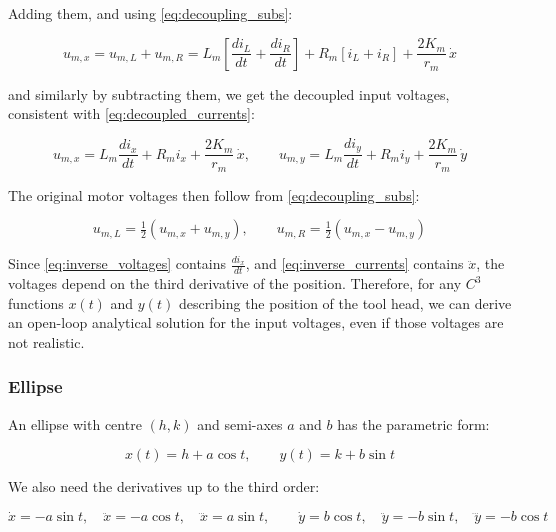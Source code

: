 Adding them, and using \eqref{eq:decoupling_subs}:

\begin{equation*}
u_{m,x} = u_{m,L} + u_{m,R}
        = L_m\left[\frac{di_L}{dt} + \frac{di_R}{dt}\right] + R_m\left[i_L + i_R\right] + \frac{2K_m}{r_m}\,\dot x
\end{equation*}

and similarly by subtracting them, we get the decoupled input voltages, consistent with \eqref{eq:decoupled_currents}:

\begin{equation}
\label{eq:inverse_voltages}
\boxed{
u_{m,x} = L_m \frac{di_x}{dt} + R_m i_x + \frac{2K_m}{r_m}\,\dot x, \qquad
u_{m,y} = L_m \frac{di_y}{dt} + R_m i_y + \frac{2K_m}{r_m}\,\dot y}
\end{equation}

The original motor voltages then follow from \eqref{eq:decoupling_subs}:

\begin{equation}
\label{eq:inverse_motor_voltages}
u_{m,L} = \tfrac{1}{2}\left(u_{m,x} + u_{m,y}\right),
\qquad
u_{m,R} = \tfrac{1}{2}\left(u_{m,x} - u_{m,y}\right)
\end{equation}

Since \eqref{eq:inverse_voltages} contains $\frac{di_x}{dt}$, and \eqref{eq:inverse_currents} contains $\ddot x$, the voltages depend on the third derivative of the position. Therefore, for any $C^3$ functions $x(t)$ and $y(t)$ describing the position of the tool head, we can derive an open-loop analytical solution for the input voltages, even if those voltages are not realistic.

\subsubsection*{Ellipse}
An ellipse with centre $(h, k)$ and semi-axes $a$ and $b$ has the parametric form:

\begin{equation}
\label{eq:ellipse}
x(t) = h + a\cos t,
\qquad
y(t) = k + b\sin t
\end{equation}

We also need the derivatives up to the third order:

\begin{equation*}
\dot x = -a\sin t, \quad \ddot x = -a\cos t, \quad \dddot x = a\sin t, \qquad
\dot y = b\cos t, \quad \ddot y = -b\sin t, \quad \dddot y = -b\cos t
\end{equation*}

